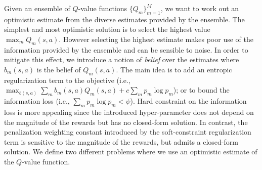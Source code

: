 Given an ensemble of $Q$-value functions $\{Q_m\}_{m=1}^M$, we want to work out an optimistic estimate from the diverse estimates provided by the ensemble. The simplest and most optimistic solution is to select the highest value $\max_m Q_m(s,a)$.
However selecting the highest estimate makes poor use of the information provided by the ensemble and can be sensible to noise. In order to mitigate this effect, we introduce a notion of \textit{belief} over the estimates where $b_m(s,a)$ is the belief of $Q_m(s,a)$. The main idea is to add an entropic regularization term to the objective (i.e., $\max_{b(s,a)} \sum_m b_m(s,a) Q_m(s,a) + c \sum_{m} p_m \log p_m $); or to bound the information loss (i.e., $\sum_m p_m \log p_m < \psi$). Hard constraint on the information loss is more appealing since the introduced hyper-parameter does not depend on the magnitude of the rewards but has no closed-form solution. In contrast, the penalization weighting constant introduced by the soft-constraint regularization term is sensitive to the magnitude of the rewards, but admits a closed-form solution.
We define two different problems where we use an optimistic estimate of the $Q$-value function.

